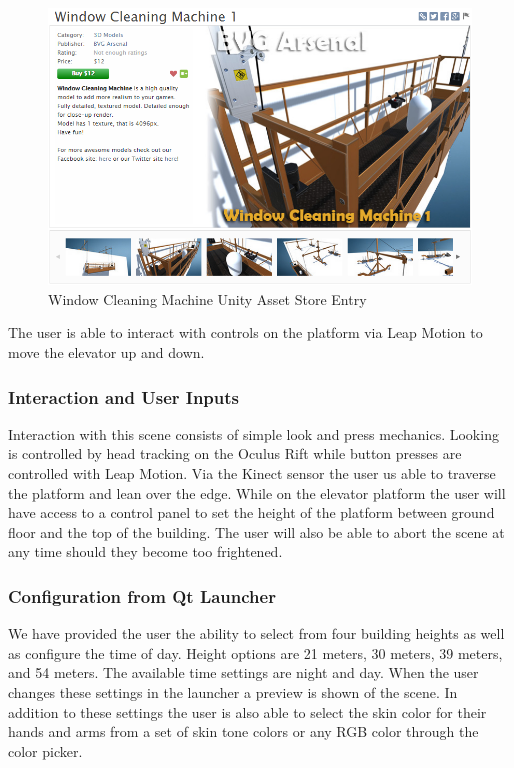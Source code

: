 \documentclass[a4paper,10pt]{article}
\begin{document}
\begin{figure}[H] %
	\centerline {\includegraphics[scale = 0.50]{elevator.png}}
	\caption{Window Cleaning Machine Unity Asset Store Entry}
	\label{fig:elevator}
\end{figure}
The user is able to interact with controls on the platform via Leap Motion to move the elevator up and down.
\subsubsection{Interaction and User Inputs}
Interaction with this scene consists of simple look and press mechanics. Looking is controlled by head tracking on the Oculus Rift while button presses are controlled with Leap Motion. Via the Kinect sensor the user us able to traverse the platform and lean over the edge. While on the elevator platform the user will have access to a control panel to set the height of the platform between ground floor and the top of the building. The user will also be able to abort the scene at any time should they become too frightened. 

\subsubsection{Configuration from Qt Launcher}
We have provided the user the ability to select from four building heights as well as configure the time of day. Height options are 21 meters, 30 meters, 39 meters, and 54 meters. The available time settings are night and day. When the user changes these settings in the launcher a preview is shown of the scene. In addition to these settings the user is also able to select the skin color for their hands and arms from a set of skin tone colors or any RGB color through the color picker.
\end{document}
